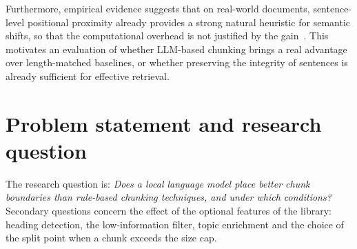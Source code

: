 Furthermore, empirical evidence suggests that on real-world documents, sentence-level
positional proximity already provides a strong natural heuristic for semantic shifts, so
that the computational overhead is not justified by the gain~\cite{qu-etal-2025-semantic}.
This motivates an evaluation of whether LLM-based chunking brings a real advantage over
length-matched baselines, or whether preserving the integrity of sentences is already
sufficient for effective retrieval.

\section{Problem statement and research question}
\label{sec:problem}

The research question is: \emph{Does a local language model place better chunk boundaries
than rule-based chunking techniques, and under which conditions?} Secondary questions
concern the effect of the optional features of the library: heading detection, the
low-information filter, topic enrichment and the choice of the split point when a chunk
exceeds the size cap.
